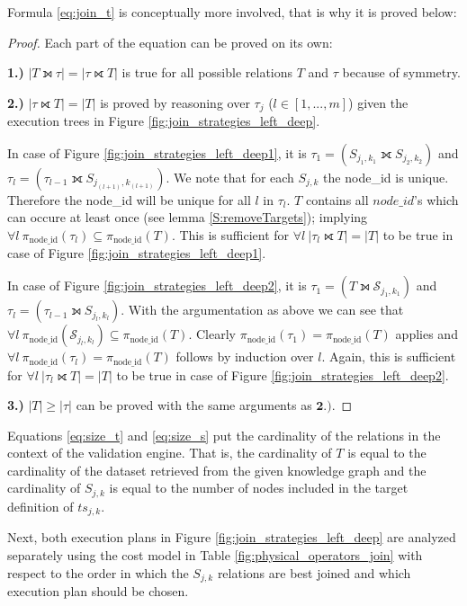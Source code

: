 Formula \ref{eq:join_t} is conceptually more involved, that is why it is proved below:
\begin{proof}
Each part of the equation can be proved on its own:

\textbf{1.)} $|T \leftouterjoin \tau| = |\tau \rightouterjoin T|$ is true for all possible relations $T$ and $\tau$ because of symmetry.

\textbf{2.)} $|\tau \rightouterjoin T| = |T|$ is proved by reasoning over $\tau_j$ ($l \in [1,...,m]$) given the execution trees in Figure \ref{fig:join_strategies_left_deep}. 

In case of Figure \ref{fig:join_strategies_left_deep1}, it is $\tau_1 = (S_{j_1,k_1} \fullouterjoin S_{j_2,k_2})$ and $\tau_l = (\tau_{l-1} \fullouterjoin S_{j_{(l+1)},k_{(l+1)}})$. We note that for each $S_{j,k}$ the \textrm{node\_id} is unique. Therefore the \textrm{node\_id} will be unique for all $l$ in $\tau_l$. $T$ contains all $node\_id$'s which can occure at least once (see lemma \ref{S:removeTargets}); implying $\forall l ~ \pi_{\textrm{node\_id}}(\tau_l) \subseteq \pi_{\textrm{node\_id}}(T)$. This is sufficient for $\forall l ~ |\tau_l \rightouterjoin T| = |T|$ to be true in case of Figure \ref{fig:join_strategies_left_deep1}.

In case of Figure \ref{fig:join_strategies_left_deep2}, it is $\tau_1 = (T \leftouterjoin \mathcal{S}_{j_1,k_1})$ and $\tau_l = (\tau_{l-1} \leftouterjoin S_{j_l,k_l})$. With the argumentation as above we can see that $\forall l ~ \pi_{\textrm{node\_id}}(\mathcal{S}_{j_l,k_l}) \subseteq \pi_{\textrm{node\_id}}(T)$. Clearly $\pi_{\textrm{node\_id}}(\tau_1) = \pi_{\textrm{node\_id}}(T)$ applies and $\forall l ~ \pi_{\textrm{node\_id}}(\tau_l) = \pi_{\textrm{node\_id}}(T)$ follows by induction over $l$. Again, this is sufficient for $\forall l ~ |\tau_l \rightouterjoin T| = |T|$ to be true in case of Figure \ref{fig:join_strategies_left_deep2}.

\textbf{3.)} $|T| \geq |\tau|$ can be proved with the same arguments as $\textbf{2.)}$.
\end{proof}

Equations \ref{eq:size_t} and \ref{eq:size_s} put the cardinality of the relations in the context of the validation engine. That is, the cardinality of $T$ is equal to the cardinality of the dataset retrieved from the given knowledge graph and the cardinality of $S_{j,k}$ is equal to the number of nodes included in the target definition of $ts_{j,k}$.

Next, both execution plans in Figure \ref{fig:join_strategies_left_deep} are analyzed separately using the cost model in Table \ref{fig:physical_operators_join} with respect to the order in which the $S_{j,k}$ relations are best joined and which execution plan should be chosen.

